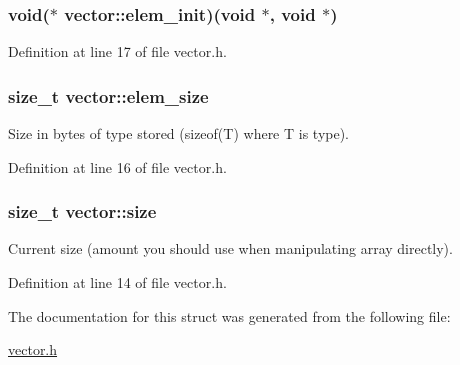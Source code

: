 \hypertarget{structvector_a9aa1b736be034d1734173299ba7874e2}{
\subsubsection[{elem\-\_\-init}]{\setlength{\rightskip}{0pt plus 5cm}void($\ast$ {\bf vector\-::elem\-\_\-init})(void $\ast$, void $\ast$)}}\label{structvector_a9aa1b736be034d1734173299ba7874e2}


\-Definition at line 17 of file vector.\-h.

\hypertarget{structvector_a5c32d3768ff522662c71cb74634bb717}{
\subsubsection[{elem\-\_\-size}]{\setlength{\rightskip}{0pt plus 5cm}size\-\_\-t {\bf vector\-::elem\-\_\-size}}}\label{structvector_a5c32d3768ff522662c71cb74634bb717}


\-Size in bytes of type stored (sizeof(\-T) where \-T is type). 



\-Definition at line 16 of file vector.\-h.

\hypertarget{structvector_a4200005b6949608d6a533db1a0d299c8}{
\subsubsection[{size}]{\setlength{\rightskip}{0pt plus 5cm}size\-\_\-t {\bf vector\-::size}}}\label{structvector_a4200005b6949608d6a533db1a0d299c8}


\-Current size (amount you should use when manipulating array directly). 



\-Definition at line 14 of file vector.\-h.



\-The documentation for this struct was generated from the following file\-:\begin{DoxyCompactItemize}
\item 
\hyperlink{vector_8h}{vector.\-h}\end{DoxyCompactItemize}
